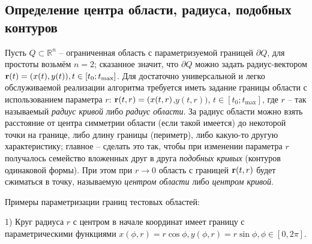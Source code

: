 \documentclass[a4paper]{article}
\newcommand{\R}[1]{\mathbb{R}^#1}
\begin{document}
\subsection{Определение центра области, радиуса, подобных контуров}
Пусть $Q \subset \R{n} $ -- ограниченная область с параметризуемой границей $\partial Q$, для простоты возьмём $n=2$;
сказанное значит, что $\partial Q$ можно задать радиус-вектором ${\bf r}(t)=(x(t),y(t)), t \in [t_0;t_{\max}]$.
Для достаточно универсальной и легко обслуживаемой реализации алгоритма требуется иметь задание границы области с использованием параметра $r$: ${\bf r}(t,r)=(x(t,r)$,$y(t,r))$, $t \in [t_0;t_{\max}]$, где $r$ -- так называемый {\it радиус кривой} либо {\it радиус области}.
За радиус области можно взять расстояние от центра симметрии области (если такой имеется) до некоторой точки на границе, либо длину границы (периметр), либо какую-то другую характеристику;
главное -- сделать это так, чтобы при изменении параметра $r$ получалось семейство вложенных друг в друга {\it подобных кривых} (контуров одинаковой формы). При этом при $r \rightarrow 0$ область с границей ${\bf r}(t,r)$ будет сжиматься в точку, называемую {\it центром области} либо {\it центром кривой}.

Примеры параметризации границ тестовых областей:

  1) Круг радиуса $r$ с центром в начале координат имеет границу с параметрическими функциями $x(\phi, r)=r \cos \phi, y(\phi, r)=r \sin \phi, \phi \in [0, 2\pi]$.
  
\end{document}
